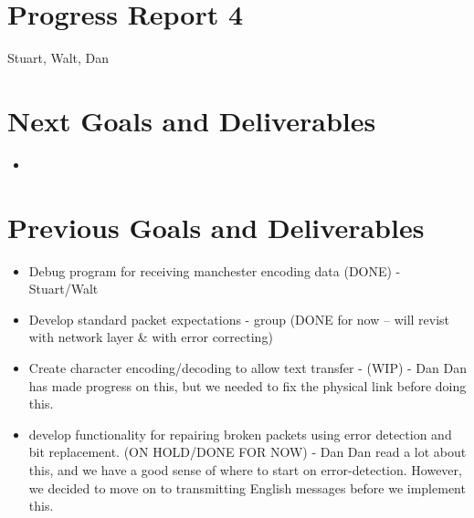 \documentclass{article}
\begin{document}
\section*{Progress Report 4}
Stuart, Walt, Dan

\section*{Next Goals and Deliverables}
\begin{itemize}
\item 
\end{itemize}

\section*{Previous Goals and Deliverables}
\begin{itemize}
    \item Debug program for receiving manchester encoding data (DONE) - Stuart/Walt
    \item Develop standard packet expectations - group (DONE for now -- will revist with network layer & with error correcting)
    \item Create character encoding/decoding to allow text transfer - (WIP) - Dan
        \subitem  Dan has made progress on this, but we needed to fix the physical link before doing this.
    \item develop functionality for repairing broken packets using error detection and bit replacement. (ON HOLD/DONE FOR NOW) - Dan
        \subitem Dan read a lot about this, and we have a good sense of where to start on error-detection. 
        However, we decided to move on to transmitting English messages before we implement this. 
\end{itemize}

\end{document}
